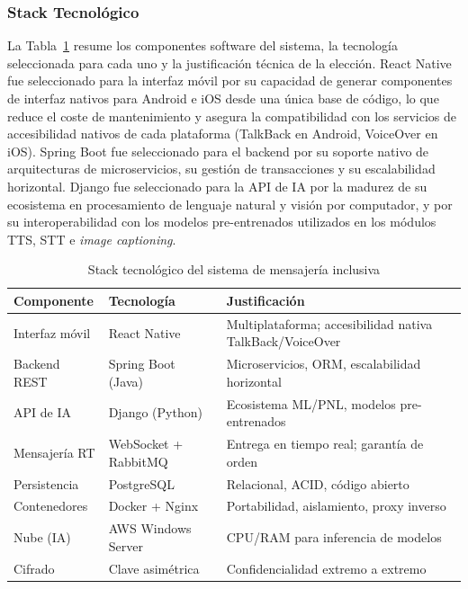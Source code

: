 \documentclass[journal]{IEEEtran}
\begin{document}
			\subsubsection{Stack Tecnol\'ogico}
				La Tabla~\ref{tab:tecnologias} resume los componentes software del sistema, la tecnolog\'ia seleccionada para cada uno y la justificaci\'on t\'ecnica de la elecci\'on. React Native fue seleccionado para la interfaz m\'ovil por su capacidad de generar componentes de interfaz nativos para Android e iOS desde una \'unica base de c\'odigo, lo que reduce el coste de mantenimiento y asegura la compatibilidad con los servicios de accesibilidad nativos de cada plataforma (TalkBack en Android, VoiceOver en iOS). Spring Boot fue seleccionado para el backend por su soporte nativo de arquitecturas de microservicios, su gesti\'on de transacciones y su escalabilidad horizontal. Django fue seleccionado para la API de IA por la madurez de su ecosistema en procesamiento de lenguaje natural y visi\'on por computador, y por su interoperabilidad con los modelos pre-entrenados utilizados en los m\'odulos TTS, STT e \textit{image captioning}.
				
				\begin{table}[!t]
					\caption{Stack tecnol\'ogico del sistema de mensajer\'ia inclusiva}
					\label{tab:tecnologias}
					\centering
					\small
					\renewcommand{\arraystretch}{1.2}
					\begin{tabular}{p{2.0cm}p{2.1cm}p{3.3cm}}
						\toprule
						\textbf{Componente} & \textbf{Tecnolog\'ia} & \textbf{Justificaci\'on} \\
						\midrule
						Interfaz m\'ovil  & React Native       & Multiplataforma; accesibilidad nativa TalkBack/VoiceOver \\
						Backend REST      & Spring Boot (Java) & Microservicios, ORM, escalabilidad horizontal \\
						API de IA         & Django (Python)    & Ecosistema ML/PNL, modelos pre-entrenados \\
						Mensajer\'ia RT   & WebSocket + RabbitMQ & Entrega en tiempo real; garant\'ia de orden \\
						Persistencia      & PostgreSQL         & Relacional, ACID, c\'odigo abierto \\
						Contenedores      & Docker + Nginx     & Portabilidad, aislamiento, proxy inverso \\
						Nube (IA)         & AWS Windows Server & CPU/RAM para inferencia de modelos \\
						Cifrado           & Clave asim\'etrica & Confidencialidad extremo a extremo \\
						\bottomrule
					\end{tabular}
				\end{table}
				
\end{document}
